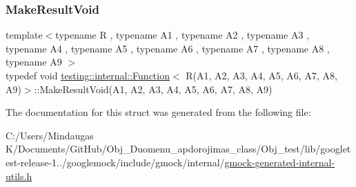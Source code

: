 \subsubsection{\texorpdfstring{MakeResultVoid}{MakeResultVoid}}
{\footnotesize\ttfamily template$<$typename R , typename A1 , typename A2 , typename A3 , typename A4 , typename A5 , typename A6 , typename A7 , typename A8 , typename A9 $>$ \\
typedef void \mbox{\hyperlink{structtesting_1_1internal_1_1_function}{testing\+::internal\+::\+Function}}$<$ R(A1, A2, A3, A4, A5, A6, A7, A8, A9)$>$\+::Make\+Result\+Void(A1, A2, A3, A4, A5, A6, A7, A8, A9)}



The documentation for this struct was generated from the following file\+:\begin{DoxyCompactItemize}
\item 
C\+:/\+Users/\+Mindaugas K/\+Documents/\+Git\+Hub/\+Obj\+\_\+\+Duomenu\+\_\+apdorojimas\+\_\+class/\+Obj\+\_\+test/lib/googletest-\/release-\/1../googlemock/include/gmock/internal/\mbox{\hyperlink{gmock-generated-internal-utils_8h}{gmock-\/generated-\/internal-\/utils.\+h}}\end{DoxyCompactItemize}
